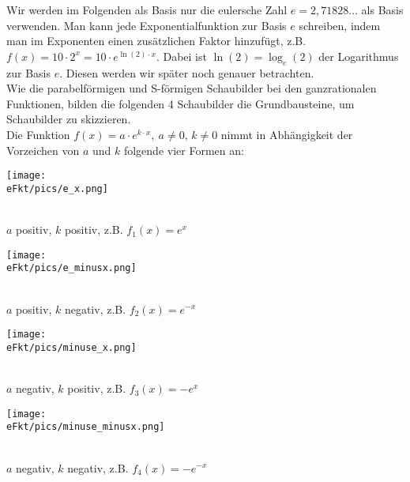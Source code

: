Wir werden im Folgenden als Basis nur die eulersche Zahl \(e=2,71828\dots\) als Basis verwenden. Man kann jede Exponentialfunktion zur Basis \(e\) schreiben, indem man im Exponenten einen zusätzlichen Faktor hinzufügt, z.B. \(f(x)=10\cdot 2^x=10\cdot e^{\ln(2)\cdot x}\). Dabei ist \(\ln(2)=\log_e(2)\) der Logarithmus zur Basis \(e\). Diesen werden wir später noch genauer betrachten.\\
Wie die parabelförmigen und S-förmigen Schaubilder bei den ganzrationalen Funktionen, bilden die folgenden 4 Schaubilder die Grundbausteine, um Schaubilder zu skizzieren.\\
Die Funktion \(f(x)=a\cdot e^{k\cdot x},\ a\neq 0,\,k\neq 0\) nimmt in Abhängigkeit der Vorzeichen von \(a\) und \(k\) folgende vier Formen an:\vspace{0.5cm}\\
\begin{minipage}{\textwidth}
	\begin{minipage}{0.49\textwidth}
		\begin{minipage}[t]{0.95\textwidth}
			\texttt{[image: \\eFkt/pics/e\_x.png]}
		\end{minipage}\\
		\centering \(a\) positiv, \(k\) positiv, z.B. \(f_1(x)=e^x\)
	\end{minipage}
	\begin{minipage}{0.49\textwidth}
		\begin{minipage}[t]{0.95\textwidth}
			\texttt{[image: \\eFkt/pics/e\_minusx.png]}
		\end{minipage}\\
		\centering \(a\) positiv, \(k\) negativ, z.B. \(f_2(x)=e^{-x}\)
	\end{minipage}
\end{minipage}\vspace{1cm}
\begin{minipage}{\textwidth}
	\begin{minipage}{0.49\textwidth}
		\begin{minipage}[t]{0.95\textwidth}
			\texttt{[image: \\eFkt/pics/minuse\_x.png]}
		\end{minipage}\\
		\centering \(a\) negativ, \(k\) positiv, z.B. \(f_3(x)=-e^x\)
	\end{minipage}
	\begin{minipage}{0.49\textwidth}
		\begin{minipage}[t]{0.95\textwidth}
			\texttt{[image: \\eFkt/pics/minuse\_minusx.png]}
		\end{minipage}\\
		\centering \(a\) negativ, \(k\) negativ, z.B. \(f_4(x)=-e^{-x}\)
	\end{minipage}
\end{minipage}
